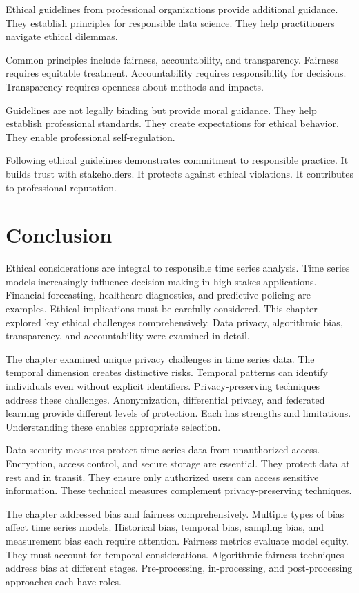 Ethical guidelines from professional organizations provide additional guidance. They establish principles for responsible data science. They help practitioners navigate ethical dilemmas.

Common principles include fairness, accountability, and transparency. Fairness requires equitable treatment. Accountability requires responsibility for decisions. Transparency requires openness about methods and impacts.

Guidelines are not legally binding but provide moral guidance. They help establish professional standards. They create expectations for ethical behavior. They enable professional self-regulation.

Following ethical guidelines demonstrates commitment to responsible practice. It builds trust with stakeholders. It protects against ethical violations. It contributes to professional reputation.



\section{Conclusion}

Ethical considerations are integral to responsible time series analysis. Time series models increasingly influence decision-making in high-stakes applications. Financial forecasting, healthcare diagnostics, and predictive policing are examples. Ethical implications must be carefully considered. This chapter explored key ethical challenges comprehensively. Data privacy, algorithmic bias, transparency, and accountability were examined in detail.

The chapter examined unique privacy challenges in time series data. The temporal dimension creates distinctive risks. Temporal patterns can identify individuals even without explicit identifiers. Privacy-preserving techniques address these challenges. Anonymization, differential privacy, and federated learning provide different levels of protection. Each has strengths and limitations. Understanding these enables appropriate selection.

Data security measures protect time series data from unauthorized access. Encryption, access control, and secure storage are essential. They protect data at rest and in transit. They ensure only authorized users can access sensitive information. These technical measures complement privacy-preserving techniques.

The chapter addressed bias and fairness comprehensively. Multiple types of bias affect time series models. Historical bias, temporal bias, sampling bias, and measurement bias each require attention. Fairness metrics evaluate model equity. They must account for temporal considerations. Algorithmic fairness techniques address bias at different stages. Pre-processing, in-processing, and post-processing approaches each have roles.

